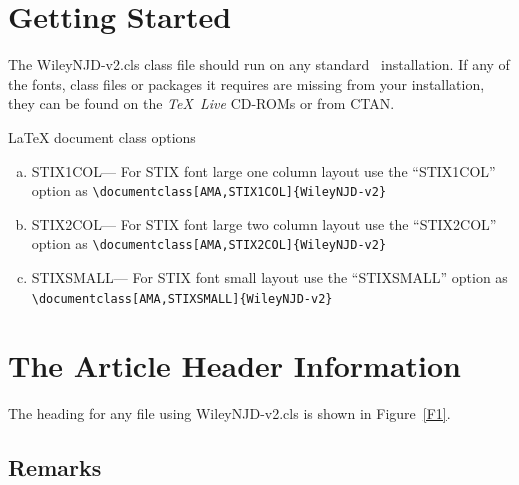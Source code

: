 \documentclass[AMA,STIX1COL]{WileyNJD-v2}
\begin{document}
\section{Getting Started} The \textsf{WileyNJD-v2.cls} class file should run
on any standard \LaTeXe\ installation. If any of the fonts, class
files or packages it requires are missing from your installation,
they can be found on the \emph{\TeX\ Live} CD-ROMs or from CTAN.

LaTeX document class options

\begin{flushleft}
\begin{enumerate}[a.]
\item STIX1COL--- For STIX font large one column layout use the ``STIX1COL'' option as \verb"\documentclass[AMA,STIX1COL]{WileyNJD-v2}"
\item STIX2COL--- For STIX font large two column layout use the ``STIX2COL'' option as \verb"\documentclass[AMA,STIX2COL]{WileyNJD-v2}"
\item STIXSMALL--- For STIX font small layout use the ``STIXSMALL'' option as \verb"\documentclass[AMA,STIXSMALL]{WileyNJD-v2}"
\end{enumerate}
\end{flushleft}



\section{The Article Header Information}
The heading for any file using \textsf{WileyNJD-v2.cls} is shown in
Figure~\ref{F1}.

\subsection{Remarks}
\end{document}
